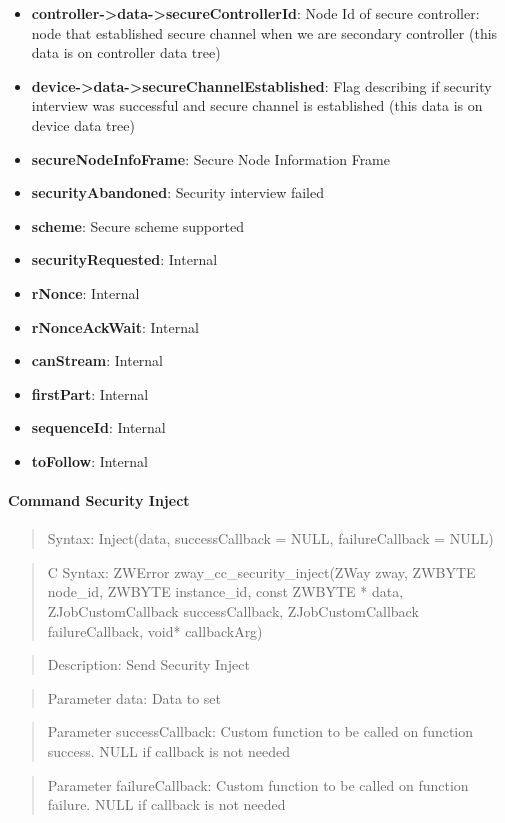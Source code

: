 \begin{itemize}
\item \textbf{controller->data->secureControllerId}: Node Id of secure controller: node that established secure channel when we are secondary controller (this data is on controller data tree)
\item \textbf{device->data->secureChannelEstablished}: Flag describing if security interview was successful and secure channel is established (this data is on device data tree)
\item \textbf{secureNodeInfoFrame}: Secure Node Information Frame
\item \textbf{securityAbandoned}: Security interview failed
\item \textbf{scheme}: Secure scheme supported
\item \textbf{securityRequested}: Internal
\item \textbf{rNonce}: Internal
\item \textbf{rNonceAckWait}: Internal
\item \textbf{canStream}: Internal
\item \textbf{firstPart}: Internal
\item \textbf{sequenceId}: Internal
\item \textbf{toFollow}: Internal
\end{itemize}

\paragraph{Command Security Inject}
\begin{quote}Syntax: Inject(data, successCallback = NULL, failureCallback = NULL)\end{quote}
\begin{quote}C Syntax: ZWError zway\_cc\_security\_inject(ZWay zway, ZWBYTE node\_id, ZWBYTE instance\_id, const ZWBYTE * data, ZJobCustomCallback successCallback, ZJobCustomCallback failureCallback, void* callbackArg)\end{quote}
\begin{quote}Description: Send Security Inject\end{quote}
\begin{quote}Parameter data: Data to set\end{quote}
\begin{quote}Parameter successCallback: Custom function to be called on function success. NULL if callback is not needed\end{quote}
\begin{quote}Parameter failureCallback: Custom function to be called on function failure. NULL if callback is not needed\end{quote}



